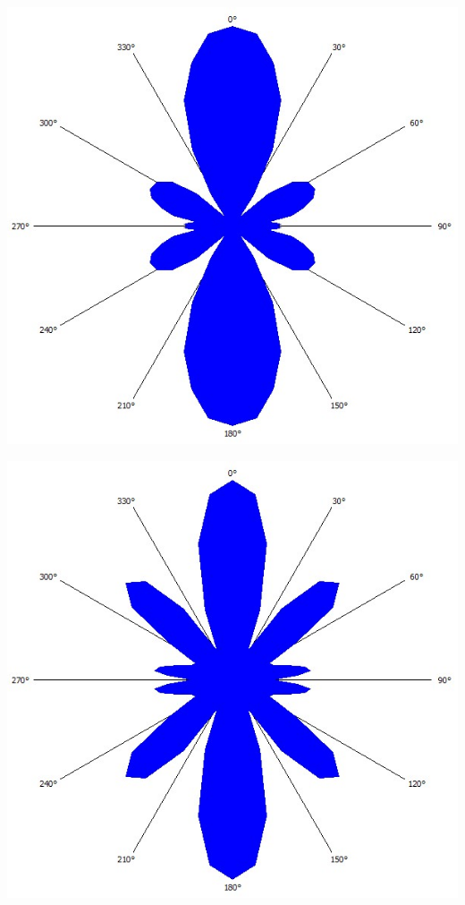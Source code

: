 \documentclass[german,  %
parskip=full,  %
]{scrartcl}
\begin{document}
\\\\
\begin{minipage}{0.48 \textwidth} \centering
\includegraphics[scale=0.3]{432_Peak_3.jpg}
\end{minipage}
\begin{minipage}{0.48 \textwidth} \centering
\includegraphics[scale=0.3]{432_Peak_4.jpg}
\end{minipage}
\end{document}
